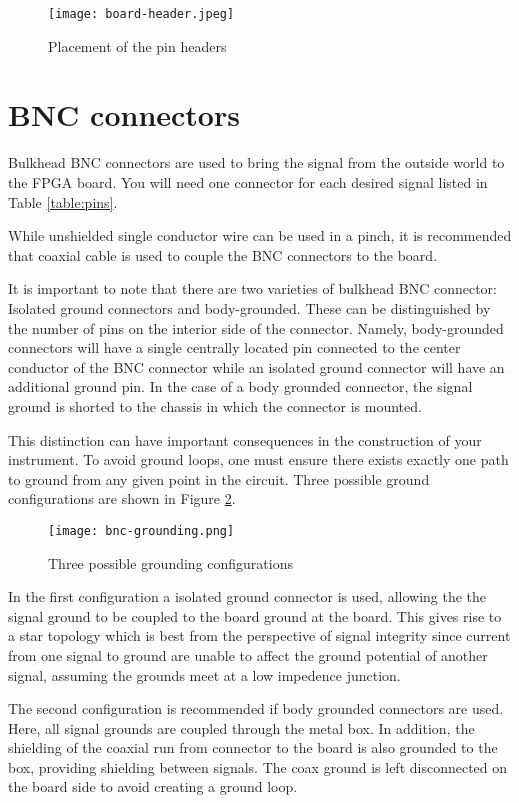 \begin{figure}
  \center
  \texttt{[image: board-header.jpeg]}
  \caption{Placement of the pin headers}
  \label{fig:header}
\end{figure}

\section{BNC connectors}

Bulkhead BNC connectors are used to bring the signal from the outside
world to the FPGA board. You will need one connector for each desired
signal listed in Table \ref{table:pins}.

While unshielded single conductor wire can be used in a pinch, it is
recommended that coaxial cable is used to couple the BNC connectors to
the board.

It is important to note that there are two varieties of bulkhead BNC
connector: Isolated ground connectors and body-grounded. These can be
distinguished by the number of pins on the interior side of the
connector. Namely, body-grounded connectors will have a single
centrally located pin connected to the center conductor of the BNC
connector while an isolated ground connector will have an additional
ground pin. In the case of a body grounded connector, the signal
ground is shorted to the chassis in which the connector is mounted.

This distinction can have important consequences in the construction
of your instrument. To avoid ground loops, one must ensure there
exists exactly one path to ground from any given point in the circuit.
Three possible ground configurations are shown in Figure \ref{fig:grounding}.

\begin{figure}
  \center
  \texttt{[image: bnc-grounding.png]}
  \caption{Three possible grounding configurations}
  \label{fig:grounding}
\end{figure}

In the first configuration a isolated ground connector is used,
allowing the the signal ground to be coupled to the board ground
at the board. This gives rise to a star topology which is best
from the perspective of signal integrity since current from one signal
to ground are unable to affect the ground potential of another signal,
assuming the grounds meet at a low impedence junction.

The second configuration is recommended if body grounded connectors
are used. Here, all signal grounds are coupled through the metal
box. In addition, the shielding of the coaxial run from connector to
the board is also grounded to the box, providing shielding between
signals. The coax ground is left disconnected on the board side to
avoid creating a ground loop.

